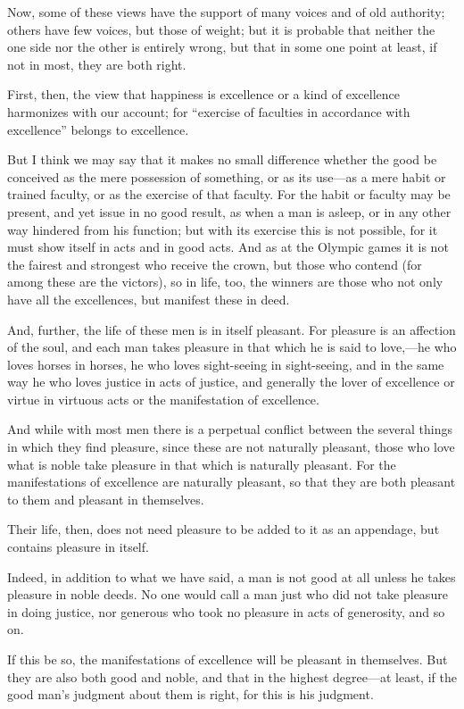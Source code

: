 Now, some of these views have the support of many voices and of old
authority; others have few voices, but those of weight; but it is
probable that neither the one side nor the other is entirely wrong,
but that in some one point at least, if not in most, they are both
right.

First, then, the view that happiness is excellence or a kind of
excellence harmonizes with our account; for ``exercise of faculties in
accordance with excellence'' belongs to excellence.

But I think we may say that it makes no small difference whether the
good be conceived as the mere  possession of something, or as
its use---as a mere habit or trained faculty, or as the exercise of
that faculty. For the habit or faculty may be present, and yet issue
in no good result, as when a man is asleep, or in any other way
hindered from his function; but with its exercise this is not
possible, for it must show itself in acts and in good acts. And as at
the Olympic games it is not the fairest and strongest who receive the
crown, but those who contend (for among these are the victors), so in
life, too, the winners are those who not only have all the
excellences, but manifest these in deed.

And, further, the life of these men is in itself pleasant. For
pleasure is an affection of the soul, and each man takes pleasure in
that which he is said to love,---he who loves horses in horses, he who
loves sight-seeing in sight-seeing, and in the same way he who loves
justice in acts of justice, and generally the lover of excellence or
virtue in virtuous acts or the manifestation of excellence.

And while with most men there is a perpetual conflict between the
several things in which they find pleasure, since these are not
naturally pleasant, those who love what is noble take pleasure in that
which is naturally pleasant. For the manifestations of excellence are
naturally pleasant, so that they are both pleasant to them and
pleasant in themselves.

Their life, then, does not need pleasure to be added to it as an
appendage, but contains pleasure in itself.

Indeed, in addition to what we have said, a man is not good at all
unless he takes pleasure in noble deeds. No one would call a man just
who did not  take pleasure in doing justice, nor generous who
took no pleasure in acts of generosity, and so on.

If this be so, the manifestations of excellence will be pleasant in
themselves. But they are also both good and noble, and that in the
highest degree---at least, if the good man's judgment about them is
right, for this is his judgment.

